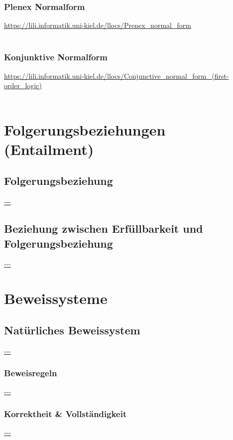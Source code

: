 \documentclass[twocolumn]{article}
\begin{document}
    \subsubsection{Plenex Normalform}
    \url{https://lili.informatik.uni-kiel.de/llocs/Prenex_normal_form}\\\\

    \subsubsection{Konjunktive Normalform}
    \url{https://lili.informatik.uni-kiel.de/llocs/Conjunctive_normal_form_(first-order_logic)}\\\\

    \section{Folgerungsbeziehungen (Entailment)}

    \subsection{Folgerungsbeziehung}
    \url{---}\\

    \subsection{Beziehung zwischen Erfüllbarkeit und Folgerungsbeziehung}
    \url{---}\\

    \section{Beweissysteme}

    \subsection{Natürliches Beweissystem}
    \url{---}\\

    \subsubsection{Beweisregeln}
    \url{---}\\

    \subsubsection{Korrektheit \& Vollständigkeit}
    \url{---}\\
\end{document}

